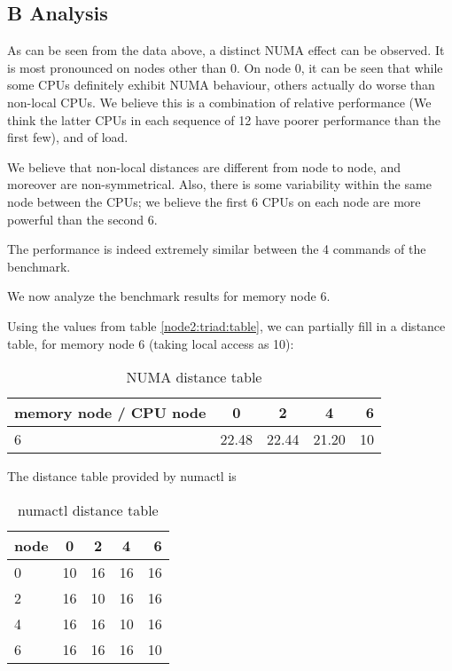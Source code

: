 \documentclass[a4paper, 12pt]{article}
\begin{document}
\subsection{B Analysis}

As can be seen from the data above, a distinct NUMA effect can be observed. It is most pronounced on nodes other than 0. On node 0, it can be seen that while some CPUs definitely exhibit NUMA behaviour, others actually do worse than non-local CPUs. We believe this is a combination of relative performance (We think the latter CPUs in each sequence of 12 have poorer performance than the first few), and of load.

We believe that non-local distances are different from node to node, and moreover are non-symmetrical. Also, there is some variability within the same node between the CPUs; we believe the first 6 CPUs on each node are more powerful than the second 6.

The performance is indeed extremely similar between the 4 commands of the benchmark.

We now analyze the benchmark results for memory node 6.

Using the values from table \ref{node2:triad:table}, we can partially fill in a distance table, for memory node 6 (taking local access as 10):

\begin{table}[H]
\begin{center}
\begin{tabular}{| l | c | c | c | r |}
\hline
memory node / CPU node & 0 & 2 & 4 & 6 \\ \hline
6 & 22.48 & 22.44 & 21.20 & 10 \\ \hline
\end{tabular}
\end{center}
\caption{NUMA distance table}
\end{table}

The distance table provided by numactl is 
\begin{table}[H]
\begin{center}
\begin{tabular}{| l | c | c | c | r |}
\hline
node &  0  & 2   & 4   & 6 \\\hline
  0 &  10  & 16  & 16  & 16 \\\hline
  2 &  16  & 10  & 16  & 16 \\\hline
  4 &  16  & 16  & 10  & 16 \\\hline
  6 &  16  & 16  & 16  & 10 \\ \hline
  \end{tabular}
  \end{center}
\caption{numactl distance table}
\end{table}
\end{document}
